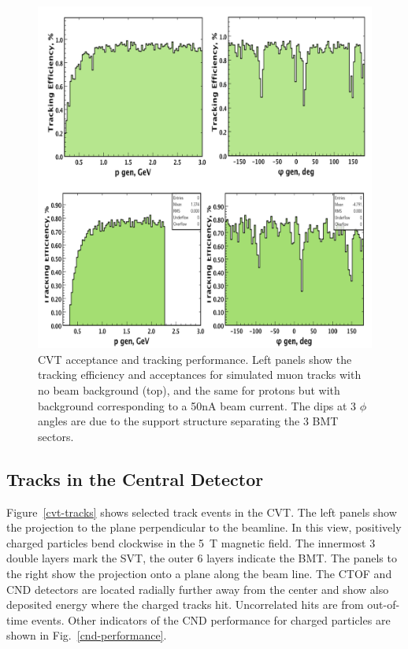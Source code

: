 \documentclass[final,3p,times,twocolumn,authoryear]{elsarticle}
\begin{document}
\begin{figure}[thbp!]
\centerline{\includegraphics[width=1.0\columnwidth]{cvt-acceptance.png}}
\caption{CVT acceptance and tracking performance. Left panels show the tracking efficiency and acceptances for 
simulated muon tracks with no beam background (top), and the same for protons but with background corresponding to 
a 50nA beam current. The dips at 3 $\phi$ angles are due to the support structure separating the 3 BMT sectors.}
\label{cvt-acceptance}
\end{figure}



\subsection{Tracks in the Central Detector}
Figure~\ref{cvt-tracks} shows selected track events in the CVT. The left panels show the projection to the plane perpendicular to the beamline. In this view, positively charged particles bend clockwise in the 5~T magnetic field. The innermost 3 double layers mark the SVT, the outer 6 layers indicate the BMT. The panels to the right show the projection onto a plane along the beam line. The CTOF and CND detectors are located radially further away from the center and show also deposited energy where the charged tracks hit. Uncorrelated hits are from out-of-time events. Other indicators of the CND performance for charged particles are shown in Fig.~\ref{cnd-performance}.  
\end{document}
